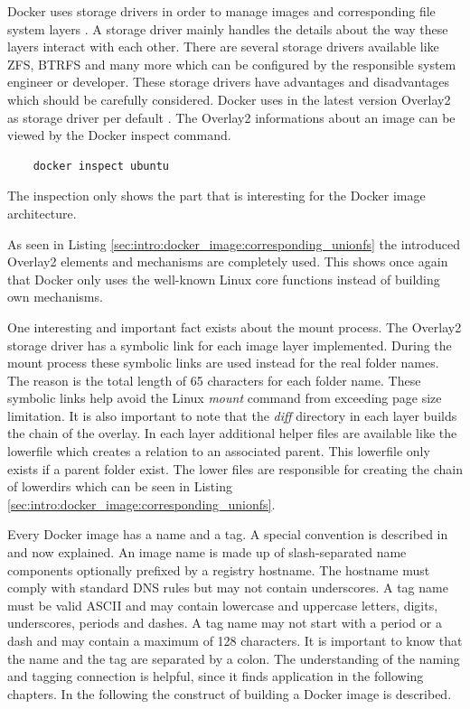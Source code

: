 Docker uses storage drivers in order to manage images and corresponding file system layers \cite{docker_storage_driver}. 
A storage driver mainly handles the details about the way these layers interact with each other.
There are several storage drivers available like ZFS, BTRFS and many more which can be configured by the responsible system engineer or developer. 
These storage drivers have advantages and disadvantages which should be carefully considered. 
Docker uses in the latest version Overlay2 as storage driver per default \cite{docker_storage_driver}. 
The Overlay2 informations about an image can be viewed by the Docker inspect command.
\begin{lstlisting}
	docker inspect ubuntu
\end{lstlisting}
The inspection only shows the part that is interesting for the Docker image architecture.

As seen in Listing \ref{sec:intro:docker_image:corresponding_unionfs} the introduced Overlay2 elements and mechanisms are completely used.
This shows once again that Docker only uses the well-known Linux core functions instead of building own mechanisms.

One interesting and important fact exists about the mount process.
The Overlay2 storage driver has a symbolic link for each image layer implemented. 
During the mount process these symbolic links are used instead for the real folder names. 
The reason is the total length of 65 characters for each folder name. 
These symbolic links help avoid the Linux \textit{mount} command from exceeding page size limitation.
It is also important to note that the \textit{diff} directory in each layer builds the chain of the overlay. 
In each layer additional helper files are available like the lowerfile which creates a relation to an associated parent. 
This lowerfile only exists if a parent folder exist. 
The lower files are responsible for creating the chain of lowerdirs which can be seen in Listing \ref{sec:intro:docker_image:corresponding_unionfs}.

Every Docker image has a name and a tag. A special convention is described in \cite{docker_tag} and now explained. 
An image name is made up of slash-separated name components optionally prefixed by a registry hostname. 
The hostname must comply with standard DNS rules but may not contain underscores. 
A tag name must be valid ASCII and may contain lowercase and uppercase letters, digits, underscores, periods and dashes. 
A tag name may not start with a period or a dash and may contain a maximum of 128 characters.
It is important to know that the name and the tag are separated by a colon.
The understanding of the naming and tagging connection is helpful, since it finds application in the following chapters.
In the following the construct of building a Docker image is described.

